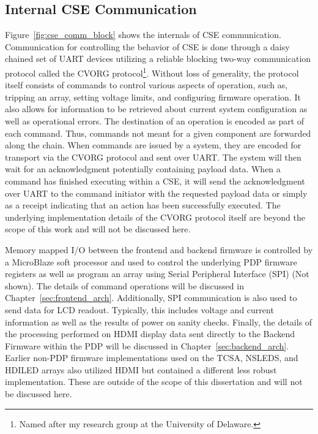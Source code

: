     \subsection{Internal CSE Communication}
        Figure~\ref{fig:cse_comm_block} shows the internals of CSE communication. Communication for controlling the behavior of CSE is done through a daisy chained set of UART devices utilizing a reliable blocking two-way communication protocol called the CVORG protocol\footnote{Named after my research group at the University of Delaware.}. Without loss of generality, the protocol itself consists of commands to control various aspects of operation, such as, tripping an array, setting voltage limits, and configuring firmware operation. It also allows for information to be retrieved about current system configuration as well as operational errors. The destination of an operation is encoded as part of each command. Thus, commands not meant for a given component are forwarded along the chain. When commands are issued by a system, they are encoded for transport via the CVORG protocol and sent over UART. The system will then wait for an acknowledgment potentially containing payload data. When a command has finished executing within a CSE, it will send the acknowledgment over UART to the command initiator with the requested payload data or simply as a receipt indicating that an action has been successfully executed. The underlying implementation details of the CVORG protocol itself are beyond the scope of this work and will not be discussed here.

        Memory mapped I/O between the frontend and backend firmware is controlled by a MicroBlaze soft processor and used to control the underlying PDP firmware registers as well as program an array using Serial Peripheral Interface (SPI) (Not shown). The details of command operations will be discussed in Chapter~\ref{sec:frontend_arch}. Additionally, SPI communication is also used to send data for LCD readout. Typically, this includes voltage and current information as well as the results of power on sanity checks. Finally, the details of the processing performed on HDMI display data sent directly to the Backend Firmware within the PDP will be discussed in Chapter~\ref{sec:backend_arch}. Earlier non-PDP firmware implementations used on the TCSA, NSLEDS, and HDILED arrays also utilized HDMI but contained a different less robust implementation. These are outside of the scope of this dissertation and will not be discussed here.

